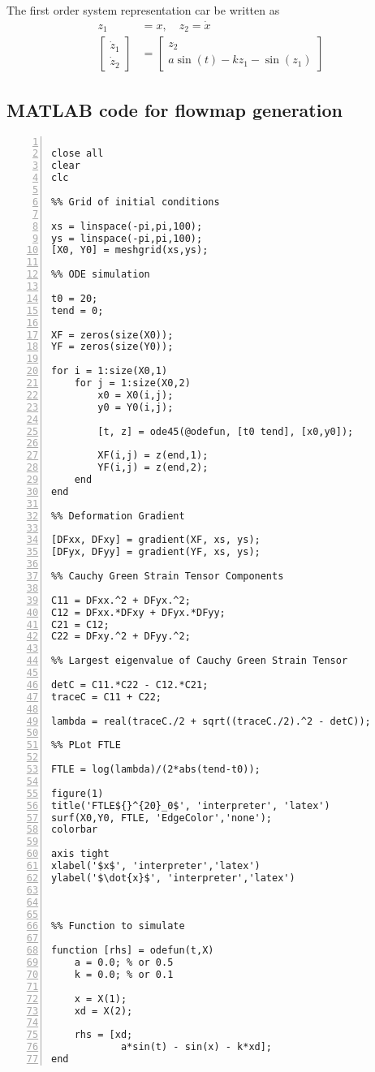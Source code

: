 \documentclass[twoside,10pt,a4paper]{article}
\begin{document}
The first order system representation car be written as
\begin{align*}
	z_1 &= x, \quad z_2 = \dot{x} \\
	\begin{bmatrix}
		\dot{z}_1 \\
		\dot{z}_2
	\end{bmatrix} &= \begin{bmatrix}
		z_2 \\
		a\sin(t) - kz_1 - \sin(z_1)
	\end{bmatrix}
\end{align*}

\subsection*{MATLAB code for flowmap generation}
\begin{Verbatim}[numbers = left]
%% Initialize script

close all
clear
clc

%% Grid of initial conditions

xs = linspace(-pi,pi,100);
ys = linspace(-pi,pi,100);
[X0, Y0] = meshgrid(xs,ys);

%% ODE simulation

t0 = 20;
tend = 0;

XF = zeros(size(X0));
YF = zeros(size(Y0));

for i = 1:size(X0,1)
    for j = 1:size(X0,2)
        x0 = X0(i,j);
        y0 = Y0(i,j);
        
        [t, z] = ode45(@odefun, [t0 tend], [x0,y0]);
        
        XF(i,j) = z(end,1);
        YF(i,j) = z(end,2);
    end
end

%% Deformation Gradient

[DFxx, DFxy] = gradient(XF, xs, ys);
[DFyx, DFyy] = gradient(YF, xs, ys);

%% Cauchy Green Strain Tensor Components

C11 = DFxx.^2 + DFyx.^2;
C12 = DFxx.*DFxy + DFyx.*DFyy;
C21 = C12;
C22 = DFxy.^2 + DFyy.^2;

%% Largest eigenvalue of Cauchy Green Strain Tensor

detC = C11.*C22 - C12.*C21;
traceC = C11 + C22;

lambda = real(traceC./2 + sqrt((traceC./2).^2 - detC));

%% PLot FTLE

FTLE = log(lambda)/(2*abs(tend-t0));

figure(1)
title('FTLE${}^{20}_0$', 'interpreter', 'latex')
surf(X0,Y0, FTLE, 'EdgeColor','none');
colorbar

axis tight
xlabel('$x$', 'interpreter','latex')
ylabel('$\dot{x}$', 'interpreter','latex')



%% Function to simulate

function [rhs] = odefun(t,X)
    a = 0.0; % or 0.5
    k = 0.0; % or 0.1
    
    x = X(1);
    xd = X(2);
    
    rhs = [xd;
            a*sin(t) - sin(x) - k*xd];
end
\end{Verbatim}
\end{document}
